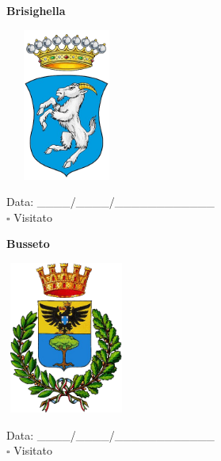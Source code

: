 \documentclass[a5paper,12pt]{article}
\begin{document}
\vspace{0.7cm}

\noindent
\begin{minipage}[t]{0.45\textwidth}
    \begin{center}
        \textbf{Brisighella}
    \end{center}
    \vspace{-0.5cm} %
    \begin{center}
        \includegraphics[height= 5cm, width=4cm]{Emilia Romagna/Stemma Brisighella.png}
    \end{center}
    \vspace{-0.4cm} %
    \begin{flushleft}
        Data: \_\_\_\_/\_\_\_\_/\_\_\_\_\_\_\_\_\_\_\_\_ \\
        $\square$ Visitato
    \end{flushleft}
\end{minipage}
\hfill
\noindent
\begin{minipage}[t]{0.45\textwidth}
    \begin{center}
        \textbf{Busseto}
    \end{center}
    \vspace{-0.5cm} %
    \begin{center}
        \includegraphics[height= 5cm, width=4cm]{Emilia Romagna/Stemma Busseto.png}
    \end{center}
    \vspace{-0.4cm} %
    \begin{flushleft}
        Data: \_\_\_\_/\_\_\_\_/\_\_\_\_\_\_\_\_\_\_\_\_ \\
        $\square$ Visitato
    \end{flushleft}
\end{minipage}
\end{document}
